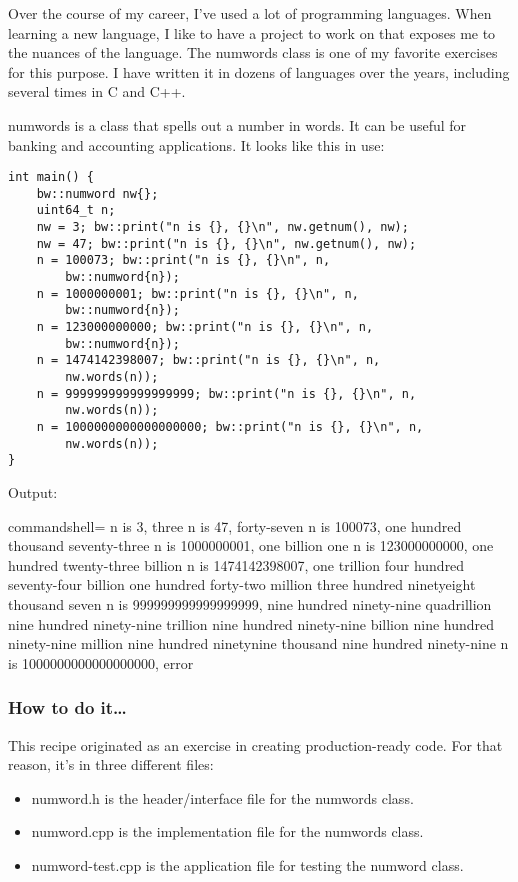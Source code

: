 
Over the course of my career, I've used a lot of programming languages. When learning a new language, I like to have a project to work on that exposes me to the nuances of the language. The numwords class is one of my favorite exercises for this purpose. I have written it in dozens of languages over the years, including several times in C and C++.

numwords is a class that spells out a number in words. It can be useful for banking and accounting applications. It looks like this in use:

\begin{lstlisting}[style=styleCXX]
int main() {
	bw::numword nw{};
	uint64_t n;
	nw = 3; bw::print("n is {}, {}\n", nw.getnum(), nw);
	nw = 47; bw::print("n is {}, {}\n", nw.getnum(), nw);
	n = 100073; bw::print("n is {}, {}\n", n,
		bw::numword{n});
	n = 1000000001; bw::print("n is {}, {}\n", n,
		bw::numword{n});
	n = 123000000000; bw::print("n is {}, {}\n", n,
		bw::numword{n});
	n = 1474142398007; bw::print("n is {}, {}\n", n,
		nw.words(n));
	n = 999999999999999999; bw::print("n is {}, {}\n", n,
		nw.words(n));
	n = 1000000000000000000; bw::print("n is {}, {}\n", n,
		nw.words(n));
}
\end{lstlisting}

Output:

\begin{tcblisting}{commandshell={}}
n is 3, three
n is 47, forty-seven
n is 100073, one hundred thousand seventy-three
n is 1000000001, one billion one
n is 123000000000, one hundred twenty-three billion
n is 1474142398007, one trillion four hundred seventy-four
billion one hundred forty-two million three hundred ninetyeight thousand seven
n is 999999999999999999, nine hundred ninety-nine quadrillion
nine hundred ninety-nine trillion nine hundred ninety-nine
billion nine hundred ninety-nine million nine hundred ninetynine thousand nine hundred ninety-nine
n is 1000000000000000000, error
\end{tcblisting}

\subsubsection{How to do it…}

This recipe originated as an exercise in creating production-ready code. For that reason, it's in three different files:

\begin{itemize}
\item 
numword.h is the header/interface file for the numwords class.

\item 
numword.cpp is the implementation file for the numwords class.

\item 
numword-test.cpp is the application file for testing the numword class.
\end{itemize}

